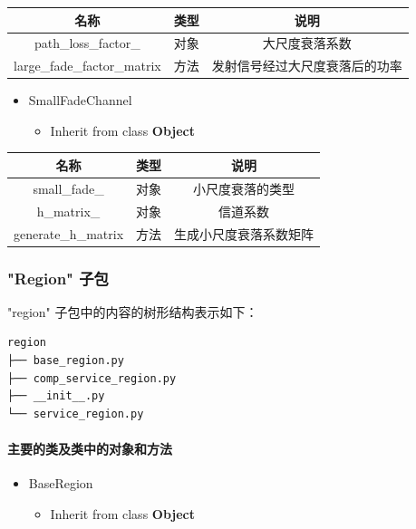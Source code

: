 \documentclass[11pt]{article}
\providecommand{\tightlist}{%
      \setlength{\itemsep}{0pt}\setlength{\parskip}{0pt}}
\begin{document}
\begin{longtable}[c]{@{}ccc@{}}
\toprule
名称 & 类型 & 说明\tabularnewline
\midrule
\endhead
path\_loss\_factor\_ & 对象 & 大尺度衰落系数\tabularnewline
large\_fade\_factor\_matrix & 方法 &
发射信号经过大尺度衰落后的功率\tabularnewline
\bottomrule
\end{longtable}

\begin{itemize}
\tightlist
\item
  SmallFadeChannel

  \begin{itemize}
  \tightlist
  \item
    Inherit from class \textbf{Object}
  \end{itemize}
\end{itemize}

\begin{longtable}[c]{@{}ccc@{}}
\toprule
名称 & 类型 & 说明\tabularnewline
\midrule
\endhead
small\_fade\_ & 对象 & 小尺度衰落的类型\tabularnewline
h\_matrix\_ & 对象 & 信道系数\tabularnewline
generate\_h\_matrix & 方法 & 生成小尺度衰落系数矩阵\tabularnewline
\bottomrule
\end{longtable}

\subsubsection{"Region" 子包}\label{region-ux5b50ux5305}

"region" 子包中的内容的树形结构表示如下：

\begin{verbatim}
region
├── base_region.py
├── comp_service_region.py
├── __init__.py
└── service_region.py
\end{verbatim}

\paragraph{主要的类及类中的对象和方法}\label{ux4e3bux8981ux7684ux7c7bux53caux7c7bux4e2dux7684ux5bf9ux8c61ux548cux65b9ux6cd5-3}

\begin{itemize}
\tightlist
\item
  BaseRegion

  \begin{itemize}
  \tightlist
  \item
    Inherit from class \textbf{Object}
  \end{itemize}
\end{itemize}
\end{document}
